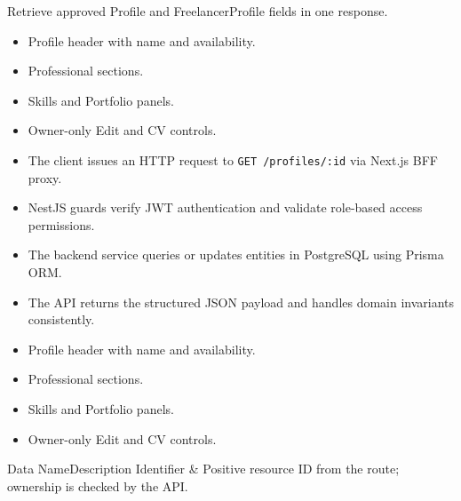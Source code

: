 \noindent Retrieve approved Profile and FreelancerProfile fields in one response.

\begin{itemize}[leftmargin=1.6em,topsep=3pt,itemsep=2pt,parsep=0pt,label=$\bullet$]
    \item Profile header with name and availability.
    \item Professional sections.
    \item Skills and Portfolio panels.
    \item Owner-only Edit and CV controls.
\end{itemize}

\begin{itemize}[leftmargin=1.6em,topsep=3pt,itemsep=2pt,parsep=0pt,label=$\bullet$]
    \item The client issues an HTTP request to \texttt{GET /\allowbreak{}profiles/\allowbreak{}:\allowbreak{}id} via Next.js BFF proxy.
    \item NestJS guards verify JWT authentication and validate role-based access permissions.
    \item The backend service queries or updates entities in PostgreSQL using Prisma ORM.
    \item The API returns the structured JSON payload and handles domain invariants consistently.
\end{itemize}

\begin{itemize}[leftmargin=1.6em,topsep=3pt,itemsep=2pt,parsep=0pt,label=$\bullet$]
    \item Profile header with name and availability.
    \item Professional sections.
    \item Skills and Portfolio panels.
    \item Owner-only Edit and CV controls.
\end{itemize}


\begin{specdatatable}{Data Name}{Description}
Identifier & Positive resource ID from the route; ownership is checked by the API.\\ \hline
\end{specdatatable}

